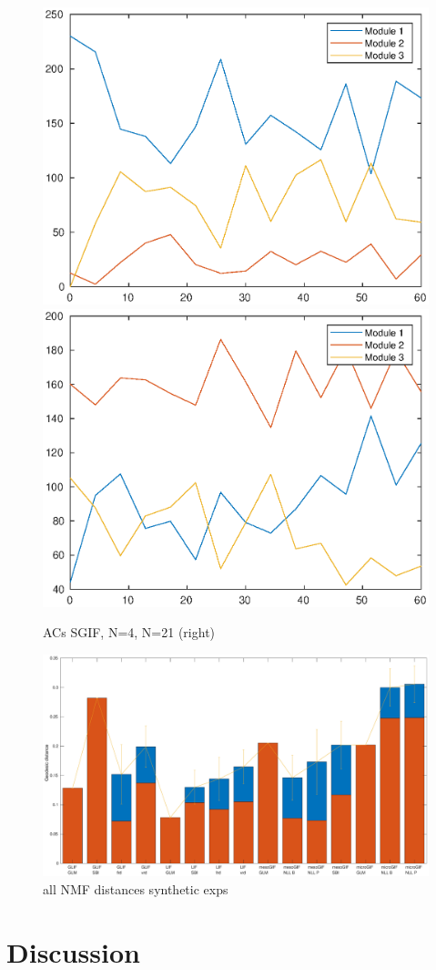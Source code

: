 \documentclass[mphil,deptreport,ianc]{infthesis} %
\begin{document}
\begin{figure}
    \includegraphics[width=0.49\columnwidth]{figures/matlab/NMF/ACs_target_GT_model_mesoGIF_N_4.eps}
    \includegraphics[width=0.49\columnwidth]{figures/matlab/NMF/ACs_target_GT_model_microGIF_N_21.eps}
    \caption{ACs SGIF, N=4, N=21 (right)}
\end{figure}


\begin{figure}
    \hspace{-0.1\columnwidth}
    \includegraphics[width=1.2\columnwidth]{figures/matlab/NMF_geodesic_all_Synthetic_v2.eps}
    \caption{all NMF distances synthetic exps}
\end{figure}


\section{Discussion}
\end{document}
